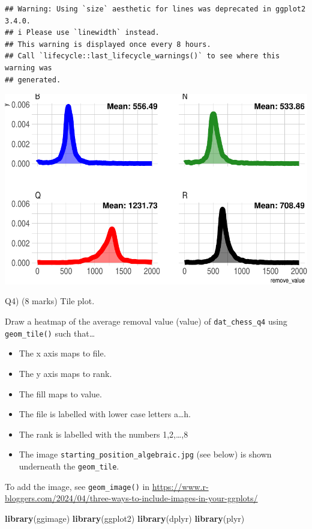 \documentclass[
]{article}
\newenvironment{Shaded}{\begin{snugshade}}{\end{snugshade}}
\newcommand{\FunctionTok}[1]{\textcolor[rgb]{0.13,0.29,0.53}{\textbf{#1}}}
\newcommand{\NormalTok}[1]{#1}
\providecommand{\tightlist}{%
  \setlength{\itemsep}{0pt}\setlength{\parskip}{0pt}}
\begin{document}
\begin{verbatim}
## Warning: Using `size` aesthetic for lines was deprecated in ggplot2 3.4.0.
## i Please use `linewidth` instead.
## This warning is displayed once every 8 hours.
## Call `lifecycle::last_lifecycle_warnings()` to see where this warning was
## generated.
\end{verbatim}

\includegraphics{STAT842_Assignment2_files/figure-latex/unnamed-chunk-5-1.pdf}

\newpage

Q4) (8 marks) Tile plot.

Draw a heatmap of the average removal value (value) of
\texttt{dat\_chess\_q4} using \texttt{geom\_tile()} such that\ldots{}

\begin{itemize}
\tightlist
\item
  The x axis maps to file.
\item
  The y axis maps to rank.
\item
  The fill maps to value.
\item
  The file is labelled with lower case letters a\ldots h.
\item
  The rank is labelled with the numbers 1,2,\ldots,8
\item
  The image \texttt{starting\_position\_algebraic.jpg} (see below) is
  shown underneath the \texttt{geom\_tile}.
\end{itemize}

To add the image, see \texttt{geom\_image()} in
\url{https://www.r-bloggers.com/2024/04/three-ways-to-include-images-in-your-ggplots/}

\begin{Shaded}
\begin{Highlighting}[]
\FunctionTok{library}\NormalTok{(ggimage)}
\FunctionTok{library}\NormalTok{(ggplot2)}
\FunctionTok{library}\NormalTok{(dplyr)}
\FunctionTok{library}\NormalTok{(plyr)}
\end{Highlighting}
\end{Shaded}
\end{document}
